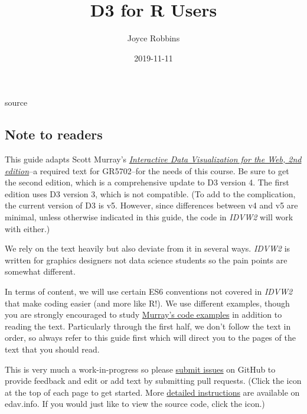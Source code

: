 \documentclass[openany]{book}
\title{D3 for R Users}
\author{Joyce Robbins}
\date{2019-11-11}
\begin{document}
\maketitle

{
\setcounter{tocdepth}{1}
\tableofcontents
}
\hypertarget{section}{%
\chapter*{}\label{section}}

\hypertarget{container}{}

source

\hypertarget{note-to-readers}{%
\section*{Note to readers }\label{note-to-readers}}

This guide adapts Scott Murray's \href{https://www.amazon.com/Interactive-Data-Visualization-Web-Introduction/dp/1491921285/}{\emph{Interactive Data Visualization for the Web, 2nd edition}}--a required text for GR5702--for the needs of this course. Be sure to get the second edition, which is a comprehensive update to D3 version 4. The first edition uses D3 version 3, which is not compatible. (To add to the complication, the current version of D3 is v5. However, since differences between v4 and v5 are minimal, unless otherwise indicated in this guide, the code in \emph{IDVW2} will work with either.)

We rely on the text heavily but also deviate from it in several ways. \emph{IDVW2} is written for graphics designers not data science students so the pain points are somewhat different.

In terms of content, we will use certain ES6 conventions not covered in \emph{IDVW2} that make coding easier (and more like R!). We use different examples, though you are strongly encouraged to study \href{https://github.com/alignedleft/d3-book/releases}{Murray's code examples} in addition to reading the text. Particularly through the first half, we don't follow the text in order, so always refer to this guide first which will direct you to the pages of the text that you should read.

This is very much a work-in-progress so please \href{https://github.com/jtr13/d3book/issues}{submit issues} on GitHub to provide feedback and edit or add text by submitting pull requests. (Click the icon at the top of each page to get started. More \href{https://edav.info/contribute.html\#step-2-click-the-edit-button}{detailed instructions} are available on edav.info. If you would just like to view the source code, click the icon.)
\end{document}
